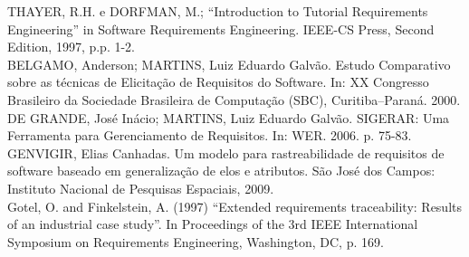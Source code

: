 THAYER, R.H. e DORFMAN, M.; “Introduction to Tutorial Requirements Engineering” in Software Requirements Engineering. IEEE-CS Press, Second Edition, 1997, p.p. 1-2.\\

BELGAMO, Anderson; MARTINS, Luiz Eduardo Galvão. Estudo Comparativo sobre as técnicas de Elicitação de Requisitos do Software. In: XX Congresso Brasileiro da Sociedade Brasileira de Computação (SBC), Curitiba–Paraná. 2000.\\

DE GRANDE, José Inácio; MARTINS, Luiz Eduardo Galvão. SIGERAR: Uma Ferramenta para Gerenciamento de Requisitos. In: WER. 2006. p. 75-83.\\

GENVIGIR, Elias Canhadas. Um modelo para rastreabilidade de requisitos de software baseado em generalização de elos e atributos. São José dos Campos: Instituto Nacional de Pesquisas Espaciais, 2009.\\

Gotel, O. and Finkelstein, A. (1997) “Extended requirements traceability: Results of an industrial case study”. In Proceedings of the 3rd IEEE International Symposium on Requirements Engineering, Washington, DC, p. 169.\\
